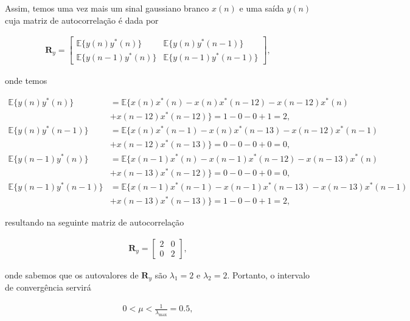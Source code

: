 \documentclass[a4paper,10pt]{article}
\begin{document}
\begin{enumerate}
\begin{enumerate}
						Assim, temos uma vez mais um sinal gaussiano branco $x(n)$ e uma saída $y(n)$ cuja matriz de autocorrelação é dada por

						\begin{align}
							\mathbf{R}_{y} =
							\begin{bmatrix}
								\mathbb{E}\{y(n) y^{*}(n)\} & \mathbb{E}\{y(n) y^{*}(n - 1)\} \\
								\mathbb{E}\{y(n - 1) y^{*}(n)\}  & \mathbb{E}\{y(n - 1) y^{*}(n - 1)\} 
							\end{bmatrix},
						\end{align}

						onde temos

						\begin{align*}
							\mathbb{E}\{y(n) y^{*}(n)\} &= \mathbb{E}\{ x(n) x^{*}(n) - x(n) x^{*}(n - 12) - x(n - 12) x^{*}(n) \\
							&+ x(n - 12) x^{*}(n - 12) \} = 1 - 0 - 0 + 1 = 2, \\
							\mathbb{E}\{y(n) y^{*}(n - 1)\} &= \mathbb{E}\{ x(n) x^{*}(n - 1) - x(n) x^{*}(n - 13) - x(n - 12) x^{*}(n - 1) \\
							&+ x(n - 12) x^{*}(n - 13) \} = 0 - 0 - 0 + 0 = 0, \\
							\mathbb{E}\{y(n - 1) y^{*}(n)\} &= \mathbb{E}\{ x(n - 1) x^{*}(n) - x(n - 1) x^{*}(n - 12) - x(n - 13) x^{*}(n) \\
							&+ x(n - 13) x^{*}(n - 12) \} = 0 - 0 - 0 + 0 = 0, \\
							\mathbb{E}\{y(n - 1) y^{*}(n - 1)\} &= \mathbb{E}\{ x(n - 1) x^{*}(n - 1) - x(n - 1) x^{*}(n - 13) - x(n - 13) x^{*}(n - 1) \\
							&+ x(n - 13) x^{*}(n - 13) \} = 1 - 0 - 0 + 1 = 2,
						\end{align*}

						resultando na seguinte matriz de autocorrelação

						\begin{align}
							\mathbf{R}_{y} =
							\begin{bmatrix}
								2 & 0 \\
								0 & 2 
							\end{bmatrix},
						\end{align}

						onde sabemos que os autovalores de $\mathbf{R}_{y}$ são $\lambda_{1} = 2$ e $\lambda_{2} = 2$. Portanto, o intervalo de convergência servirá

						\begin{align}
							0 < \mu < \frac{1}{\lambda_{\text{max}}} = 0.5,
						\end{align}


\end{enumerate}
\end{enumerate}
\end{document}
